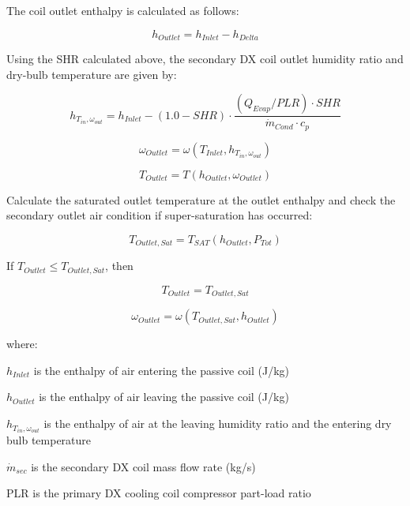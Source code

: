 The coil outlet enthalpy is calculated as follows:

\begin{equation}
  h_{Outlet} = h_{Inlet}-h_{Delta}
\end{equation}

Using the SHR calculated above, the secondary DX coil outlet humidity ratio and dry-bulb temperature are given by:

\begin{equation}
  h_{T_{in},\omega_{out}} = h_{Inlet} - \left(1.0 - SHR\right) \cdot \frac{\left(Q_{Evap}/PLR\right)\cdot SHR}{\dot{m}_{Cond}\cdot c_p}
\end{equation}

\begin{equation}
  \omega_{Outlet} = \omega( T_{Inlet}, h_{T_{in},\omega_{out}} )
\end{equation}

\begin{equation}
  T_{Outlet} = T( h_{Outlet}, \omega_{Outlet} )
\end{equation}

Calculate the saturated outlet temperature at the outlet enthalpy and check the secondary outlet air condition if super-saturation has occurred:

\begin{equation}
  T_{Outlet, Sat} = T_{SAT}\left(h_{Outlet}, P_{Tot}\right)
\end{equation}

If \(T_{Outlet} \leq T_{Outlet, Sat}\), then

\begin{equation}
  T_{Outlet} = T_{Outlet, Sat}
\end{equation}

\begin{equation}
  \omega_{Outlet} = \omega\left(T_{Outlet,Sat},h_{Outlet}\right)
\end{equation}

where:

\(h_{Inlet}\) is the enthalpy of air entering the passive coil (J/kg)

\(h_{Outlet}\) is the enthalpy of air leaving the passive coil (J/kg)

\(h_{T_{in},\omega_{out}}\) is the enthalpy of air at the leaving humidity ratio and the entering dry bulb temperature

\(\dot{m}_{sec}\) is the secondary DX coil mass flow rate (kg/s)

PLR is the primary DX cooling coil compressor part-load ratio

